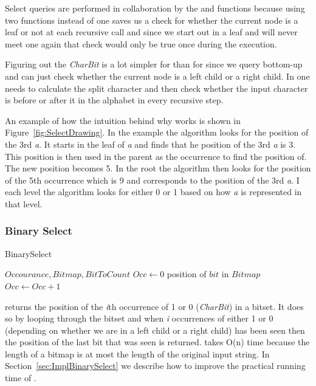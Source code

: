 Select queries are performed in collaboration by the  and  functions because using two functions instead of one saves us a check for whether the current node is a leaf or not at each recursive call and since we start out in a leaf and will never meet one again that check would only be true once during the execution.

Figuring out the \textit{CharBit} is a lot simpler for  than for  since we query bottom-up and can just check whether the current node is a left child or a right child. 
In  one needs to calculate the split character and then check whether the input character is before or after it in the alphabet in every recursive step.

An example of how the intuition behind why  works is shown in Figure~\ref{fig:SelectDrawing}.
In the example the algorithm looks for the position of the 3rd \textit{a}.
It starts in the leaf of \textit{a} and finds that he position of the 3rd \textit{a} is 3. 
This position is then used in the parent as the occurrence to find the position of. 
The new position becomes 5.
In the root the algorithm then looks for the position of the 5th occurrence which is 9 and corresponds to the position of the 3rd \textit{a}.
I each level the algorithm looks for either 0 or 1 based on how \textit{a} is represented in that level.

\subsubsection{Binary Select}
\begin{algorithm}
\caption{BinarySelect}
\label{alg:binaryselect}
\begin{algorithmic}
 {$Occourance, Bitmap, BitToCount$}
\State $Occ \gets 0$
		\State \Return position of $bit$ in $Bitmap$
	\EndIf
	\State $Occ \gets Occ + 1$
	\EndIf
\EndFor
\EndFunction
\end{algorithmic}
\end{algorithm}

 returns the position of the \textit{i}th occurrence of 1 or 0 (\textit{CharBit}) in a bitset. 
It does so by looping through the bitset and when \textit{i} occurrences of either 1 or 0 (depending on whether we are in a left child or a right child) has been seen then the position of the last bit that was seen is returned.
 takes O(n) time because the length of a bitmap is at most the length of the original input string.
In Section~\ref{sec:ImplBinarySelect} we describe how to improve the practical running time of .

